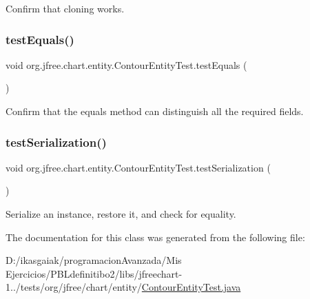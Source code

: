 Confirm that cloning works. \mbox{\label{classorg_1_1jfree_1_1chart_1_1entity_1_1_contour_entity_test_a4e2d7f94b540d8e877f9fe56ecf5f2ba}} 
\subsubsection{\texorpdfstring{test\+Equals()}{testEquals()}}
{\footnotesize\ttfamily void org.\+jfree.\+chart.\+entity.\+Contour\+Entity\+Test.\+test\+Equals (\begin{DoxyParamCaption}{ }\end{DoxyParamCaption})}

Confirm that the equals method can distinguish all the required fields. \mbox{\label{classorg_1_1jfree_1_1chart_1_1entity_1_1_contour_entity_test_a4b27b6813dc1454799035a68d7d2511f}} 
\subsubsection{\texorpdfstring{test\+Serialization()}{testSerialization()}}
{\footnotesize\ttfamily void org.\+jfree.\+chart.\+entity.\+Contour\+Entity\+Test.\+test\+Serialization (\begin{DoxyParamCaption}{ }\end{DoxyParamCaption})}

Serialize an instance, restore it, and check for equality. 

The documentation for this class was generated from the following file\+:\begin{DoxyCompactItemize}
\item 
D\+:/ikasgaiak/programacion\+Avanzada/\+Mis Ejercicios/\+P\+B\+Ldefinitibo2/libs/jfreechart-\/1../tests/org/jfree/chart/entity/\mbox{\hyperlink{_contour_entity_test_8java}{Contour\+Entity\+Test.\+java}}\end{DoxyCompactItemize}
